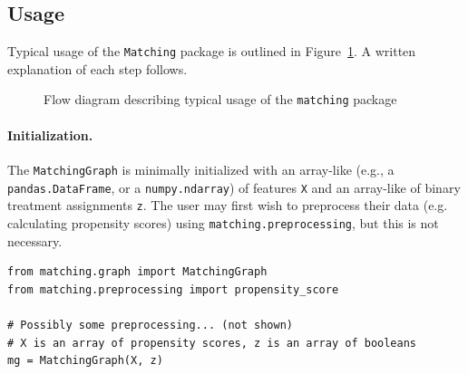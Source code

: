 \documentclass[11pt]{extarticle}
\begin{document}
\newpage
\subsection{Usage}
\label{subsec:usage}

Typical usage of the \texttt{Matching} package is outlined in Figure~\ref{fig:matching_usage}. A written explanation of each step follows.

\begin{figure}[h!]
  \caption{\label{fig:matching_usage} Flow diagram describing typical usage of the \texttt{matching} package}
\end{figure}

\paragraph{Initialization.} 
The \texttt{MatchingGraph} is minimally initialized with an array-like (e.g., a \texttt{pandas.DataFrame}, or a \texttt{numpy.ndarray}) of features \texttt{X} and an array-like of binary treatment assignments \texttt{z}. The user may first wish to preprocess their data (e.g. calculating propensity scores) using \texttt{matching.preprocessing}, but this is not necessary.
\begin{verbatim}
from matching.graph import MatchingGraph
from matching.preprocessing import propensity_score

# Possibly some preprocessing... (not shown)
# X is an array of propensity scores, z is an array of booleans
mg = MatchingGraph(X, z)
\end{verbatim}
\end{document}
